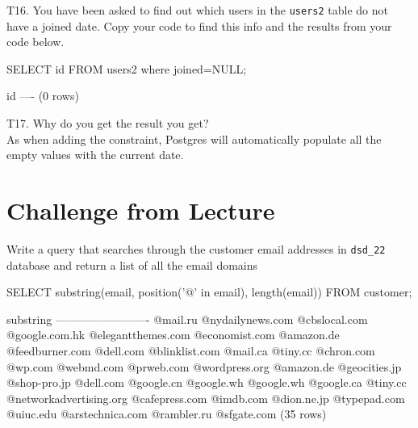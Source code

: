 T16. You have been asked to find out which users in the \verb|users2| table do not have a joined date. Copy your code to find this info and the results from your code below.
\begin{sql}
SELECT id FROM users2 where joined=NULL;
\end{sql}
\begin{pseudo*}
 id
----
(0 rows)
\end{pseudo*}

T17. Why do you get the result you get?\\
As when adding the constraint, Postgres will automatically populate all the empty values with the current date. 

\section*{Challenge from Lecture}
Write a query that searches through the customer email addresses in \verb|dsd_22| database and return a list of all the email domains
\begin{sql}
SELECT substring(email, position('@' in email), length(email)) FROM customer;
\end{sql}
\begin{pseudo*}
        substring
-------------------------
 @mail.ru
 @nydailynews.com
 @cbslocal.com
 @google.com.hk
 @elegantthemes.com
 @economist.com
 @amazon.de
 @feedburner.com
 @dell.com
 @blinklist.com
 @mail.ca
 @tiny.cc
 @chron.com
 @wp.com
 @webmd.com
 @prweb.com
 @wordpress.org
 @amazon.de
 @geocities.jp
 @shop-pro.jp
 @dell.com
 @google.cn
 @google.wh
 @google.wh
 @google.ca
 @tiny.cc
 @networkadvertising.org
 @cafepress.com
 @imdb.com
 @dion.ne.jp
 @typepad.com
 @uiuc.edu
 @arstechnica.com
 @rambler.ru
 @sfgate.com
(35 rows)
\end{pseudo*}